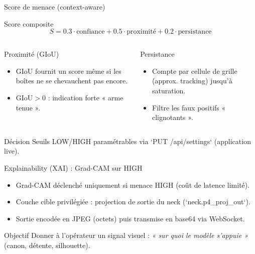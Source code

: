 \documentclass[aspectratio=169,11pt]{beamer}
\begin{document}
\begin{frame}{Score de menace (context-aware)}
  \begin{block}{Score composite}
    \vspace{-0.1cm}
    \[
      S = 0.3\cdot\text{confiance} + 0.5\cdot\text{proximité} + 0.2\cdot\text{persistance}
    \]
  \end{block}

  \begin{columns}[T,onlytextwidth]
    \begin{block}{Proximité (GIoU)}
      \begin{itemize}
        \item GIoU fournit un score même si les boîtes ne se chevauchent pas encore.
        \item \(\text{GIoU} > 0\) : indication forte « arme tenue ».
      \end{itemize}
    \end{block}

    \begin{block}{Persistance}
      \begin{itemize}
        \item Compte par cellule de grille (approx. tracking) jusqu'à saturation.
        \item Filtre les faux positifs « clignotants ».
      \end{itemize}
    \end{block}
  \end{columns}

  \vspace{0.2cm}
  \begin{alertblock}{Décision}
    Seuils LOW/HIGH paramétrables via `PUT /api/settings` (application live).
  \end{alertblock}
\end{frame}

\begin{frame}{Explainability (XAI) : Grad-CAM sur HIGH}
  \begin{itemize}
    \item Grad-CAM déclenché uniquement si menace HIGH (coût de latence limité).
    \item Couche cible privilégiée : projection de sortie du neck (`neck.p4\_proj\_out`).
    \item Sortie encodée en JPEG (octets) puis transmise en base64 via WebSocket.
  \end{itemize}

  \vspace{0.2cm}
  \begin{block}{Objectif}
    Donner à l'opérateur un signal visuel : \textit{« sur quoi le modèle s'appuie »} (canon, détente, silhouette).
  \end{block}
\end{frame}
\end{document}
